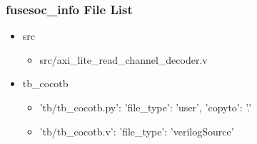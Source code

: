 \subsubsection{fusesoc\_info File List}
\begin{itemize}
\item src
	\begin{itemize}
	\item src/axi\_lite\_read\_channel\_decoder.v
	\end{itemize}
\item tb\_cocotb
	\begin{itemize}
	\item {'tb/tb\_cocotb.py': {'file\_type': 'user', 'copyto': '.'}}
	\item {'tb/tb\_cocotb.v': {'file\_type': 'verilogSource'}}
	\end{itemize}
\end{itemize}
